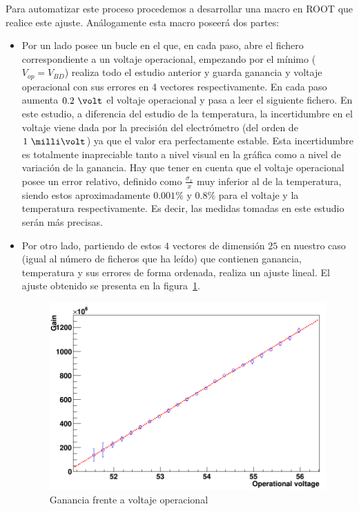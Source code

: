 Para automatizar este proceso procedemos a desarrollar una macro en ROOT que realice este ajuste. Análogamente esta macro poseerá dos partes:
\begin{itemize}
\item{} Por un lado posee un bucle en el que, en cada paso, abre el fichero correspondiente a un voltaje operacional, empezando por el mínimo ($V_{op}=V_{BD}$) realiza todo el estudio anterior y guarda ganancia y voltaje operacional con sus errores en 4 vectores respectivamente. En cada paso aumenta $0.2~\volt$ el voltaje operacional y pasa a leer el siguiente fichero. 
En este estudio, a diferencia del estudio de la temperatura, la incertidumbre en el voltaje viene dada por la precisión del electrómetro (del orden de $1~\milli\volt$) ya que el valor era perfectamente estable. Esta incertidumbre es  totalmente inapreciable tanto a nivel visual en la gráfica como a nivel de variación de la ganancia. 
Hay que tener en cuenta que el voltaje operacional posee un error relativo, definido como $\frac{\sigma_x}{x}$ muy inferior al de la temperatura, siendo estos aproximadamente $0.001\%$ y $0.8\%$ para el voltaje y la temperatura respectivamente. Es decir, las medidas tomadas en este estudio serán más precisas.

\item {} Por otro lado, partiendo de estos $4$ vectores de dimensión $25$ en nuestro caso (igual al número de ficheros que ha leído) que contienen ganancia, temperatura y sus errores de forma ordenada, realiza un ajuste lineal. El ajuste obtenido se presenta en la figura~\ref{voltaje}.

\begin{figure}[hbtp]
\centering
\includegraphics[scale=0.4]{Dependenciavoltaje.png}
\caption{ Ganancia frente a voltaje operacional\label{voltaje}}
\end{figure}


\end{itemize}

